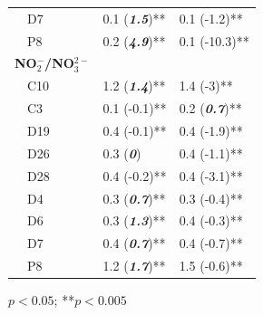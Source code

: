 \documentclass[journal = esthag, manuscript = article]{achemso}\usepackage[]{graphicx}\usepackage[]{color}
\begin{document}
\begin{table}[!tbp]
\begin{center}
\begin{tabular}{lll}
~~D7&0.1 \footnotesize{(\textit{\textbf{1.5}})**}&0.1 \footnotesize{(-1.2)**}\tabularnewline
~~P8&0.2 \footnotesize{(\textit{\textbf{4.9}})**}&0.1 \footnotesize{(-10.3)**}\tabularnewline
\hline
{\bfseries NO$_{2}^{-}$/NO$_{3}^{2-}$}&&\tabularnewline
~~C10&1.2 \footnotesize{(\textit{\textbf{1.4}})**}&1.4 \footnotesize{(-3)**}\tabularnewline
~~C3&0.1 \footnotesize{(-0.1)**}&0.2 \footnotesize{(\textit{\textbf{0.7}})**}\tabularnewline
~~D19&0.4 \footnotesize{(-0.1)**}&0.4 \footnotesize{(-1.9)**}\tabularnewline
~~D26&0.3 \footnotesize{(\textit{\textbf{0}})}&0.4 \footnotesize{(-1.1)**}\tabularnewline
~~D28&0.4 \footnotesize{(-0.2)**}&0.4 \footnotesize{(-3.1)**}\tabularnewline
~~D4&0.3 \footnotesize{(\textit{\textbf{0.7}})**}&0.3 \footnotesize{(-0.4)**}\tabularnewline
~~D6&0.3 \footnotesize{(\textit{\textbf{1.3}})**}&0.4 \footnotesize{(-0.3)**}\tabularnewline
~~D7&0.4 \footnotesize{(\textit{\textbf{0.7}})**}&0.4 \footnotesize{(-0.7)**}\tabularnewline
~~P8&1.2 \footnotesize{(\textit{\textbf{1.7}})**}&1.5 \footnotesize{(-0.6)**}\tabularnewline
\hline
\end{tabular}\end{center}

\footnotesize *$p<0.05$; **$p<0.005$\end{table}
\end{document}
